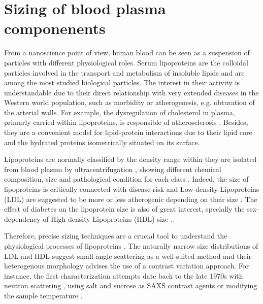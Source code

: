 \section{Sizing of blood plasma componenents}
\label{sec:lipoprotein_continuous}

From a nanoscience point of view, human blood can be seen as a suspension of particles with different physiological roles. Serum lipoproteins are the colloidal particles involved in the transport and metabolism of insoluble lipids and are among the most studied biological particles. The interest in their activity is understandable due to their direct relationship with very extended diseases in the Western world population, such as morbidity or atherogenesis, e.g. obturation of the arterial walls. For example, the dysregulation of cholesterol in plasma, primarly carried within lipoproteins, is responsible of atherosclerosis \cite{munro_pathogenesis_1988}. Besides, they are a convenient model for lipid-protein interactions \cite{assmann_lipid-protein_1974} due to their lipid core and the hydrated proteins isometrically situated on its surface.

Lipoproteins are normally classified by the density range within they are isolated from blood plasma by ultracentrifugation \cite{havel_distribution_1955}, showing different chemical composition, size and pathological condition for each class \cite{german_lipoproteins:_2006}. Indeed, the size of lipoproteins is critically connected with disease risk \cite{gardner_cd_association_1996} and Low-density Lipoproteins (LDL) are suggested to be more or less atherogenic depending on their size \cite{dreon_low-density_1994}. The effect of diabetes on the lipoprotein size is also of great interest, specially the sex-dependency of High-density Lipoproteins (HDL) size \cite{colhoun_lipoprotein_2002}.

Therefore, precise sizing techniques are a crucial tool to understand the physiological processes of lipoproteins \cite{german_lipoproteins:_2006}. The naturally narrow size distributions of LDL and HDL suggest small-angle scattering as a well-suited method and their heterogenous morphology advises the use of a contrast variation approach. For instance, the first characterization attempts date back to the late 1970s with neutron scattering \cite{stuhrmann_neutron_1975}, using salt \cite{tardieu_structure_1976} and sucrose \cite{muller_structure_1978} as SAXS contrast agents or modifying the sample temperature \cite{laggner_molecular_1977,luzzati_structure_1979}. 

